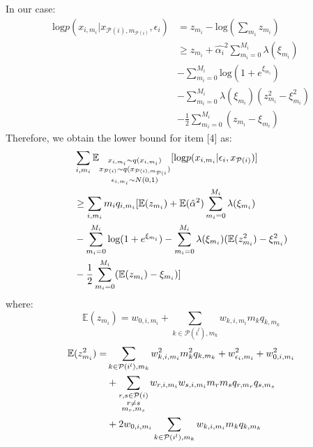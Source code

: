 \documentclass[review]{elsarticle}
\begin{document}
In our case:
\begin{equation*}
\begin{aligned}
       \text{log}p(x_{i, m_{i}}|x_{\mathcal{P}(i), m_{\mathcal{P}(i)}}, \epsilon_{i}) & = z_{m_{i}} - \text{log}(\sum_{m_{i}} z_{m_{i}}) \\
       & \geq z_{m_{i}} + \hat{\alpha_{i}}^{2}\sum_{m_{i} = 0}^{M_{i}}\lambda(\xi_{m_{i}}) \\
       & -\sum_{m_{i} = 0}^{M_{i}}\text{log}(1+e^{\xi_{m_{i}}}) \\
       & -\sum_{m_{i} = 0}^{M_{i}}\lambda(\xi_{m_{i}})(z_{m_{i}}^{2}-\xi_{m_{i}}^{2}) \\
       & -\frac{1}{2}\sum_{m_{i} = 0}^{M_{i}}(z_{m_{i}} - \xi_{m_{i}})
\end{aligned}
\end{equation*}
\noindent Therefore, we obtain the lower bound for item [4] as: 
\begin{equation*}
\begin{aligned}
    & \sum_{i, m_{i}}\mathbb{E}_{\begin{subarray}{c} x_{i,m_{i}} \sim q(x_{i,m_{i}})\\ x_{\mathcal{P}(i)} \sim q(x_{\mathcal{P}(i),m_{\mathcal{P}(i}})\\ \epsilon_{i,m_{i}} \sim N(0,1) \end{subarray}}[\text{log}p(x_{i,m_{i}}|\epsilon_{i},x_{\mathcal{P}(i)})] \\
    & \geq  \sum_{i, m_{i}}m_{i}q_{i, m_{i}}[ \mathbb{E}(z_{m_{i}}) + \mathbb{E}(\hat{\alpha}^{2})\sum_{m_{i} = 0}^{M_{i}}\lambda(\xi_{m_{i}})\\
    &-\sum_{m_{i} = 0}^{M_{i}}\text{log}(1+e^{\xi_{m_{i}}})  -\sum_{m_{i} = 0}^{M_{i}}\lambda(\xi_{m_{i}})(\mathbb{E}(z_{m_{i}}^{2})-\xi_{m_{i}}^{2})\\
    &-\frac{1}{2}\sum_{m_{i} = 0}^{M_{i}}(\mathbb{E}(z_{m_{i}}) - \xi_{m_{i}})]
\end{aligned} 
\end{equation*}
\noindent where:
\begin{equation*}
    \mathbb{E}(z_{m_{i}})  =  w_{0,i, m_{i}}  + \sum_{k \in {\mathcal{P}(i^l)}, m_{k}}w_{k, i, m_{i}}m_{k}q_{k, m_{k}}
\end{equation*}
\begin{equation*}
\begin{aligned}
    \mathbb{E}(z_{m_{i}}^{2}) = &
    \sum_{k \in {\mathcal{P}(i^l)}, m_{k}}w_{k, i, m_{i}}^{2}m_{k}^{2}q_{k, m_{k}} + w_{\epsilon_{i}, m_{i}}^{2} + w_{0,i, m_{i}}^{2} \\
    & + \sum_{\begin{subarray}{c}r, s \in \mathcal{P}(i)\\ r \neq s \\ m_{r}, m_{s} \end{subarray}}w_{r, i, m_{i}}w_{s, i, m_{i}}m_{r}m_{s}q_{r, m_{r}}q_{s, m_{s}} \\
    & + 2w_{0,i, m_{i}}\sum_{k \in {\mathcal{P}(i^l)}, m_{k}}w_{k, i, m_{i}}m_{k}q_{k, m_{k}}
\end{aligned}
\end{equation*}
\end{document}
